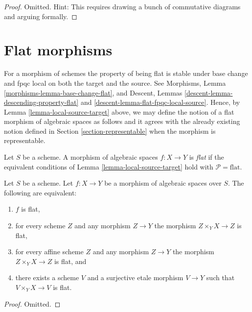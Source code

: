 \begin{proof}
Omitted. Hint: This requires drawing a bunch of commutative diagrams
and arguing formally.
\end{proof}








\section{Flat morphisms}
\label{section-flat}

\noindent
For a morphism of schemes the property of being flat is
stable under base change and fpqc local on
both the target and the source. See
Morphisms, Lemma \ref{morphisms-lemma-base-change-flat}, and
Descent, Lemmas \ref{descent-lemma-descending-property-flat} and
\ref{descent-lemma-flat-fpqc-local-source}.
Hence, by
Lemma \ref{lemma-local-source-target}
above, we may define the notion of a flat morphism of algebraic spaces as
follows and it agrees with the already existing notion defined in
Section \ref{section-representable}
when the morphism is representable.

\begin{definition}
\label{definition-flat}
Let $S$ be a scheme.
A morphism of algebraic spaces $f : X \to Y$ is {\it flat} if
the equivalent conditions of Lemma \ref{lemma-local-source-target} hold with
$\mathcal{P} = \text{flat}$.
\end{definition}

\begin{lemma}
\label{lemma-flat-local}
Let $S$ be a scheme.
Let $f : X \to Y$ be a morphism of algebraic spaces over $S$.
The following are equivalent:
\begin{enumerate}
\item $f$ is flat,
\item for every scheme $Z$ and any morphism $Z \to Y$ the morphism
$Z \times_Y X \to Z$ is flat,
\item for every affine scheme $Z$ and any morphism
$Z \to Y$ the morphism $Z \times_Y X \to Z$ is flat, and
\item there exists a scheme $V$ and a surjective etale morphism
$V \to Y$ such that $V \times_Y X \to V$ is flat.
\end{enumerate}
\end{lemma}

\begin{proof}
Omitted.
\end{proof}

